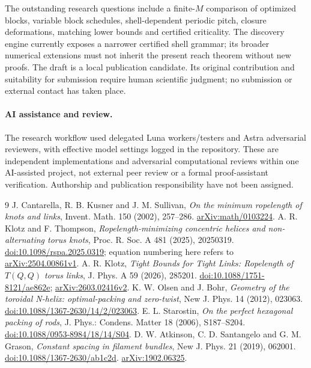 \documentclass[11pt]{article}
\begin{document}
The outstanding research questions include a finite-$M$ comparison of
optimized blocks, variable block schedules, shell-dependent periodic pitch,
closure deformations, matching lower bounds and certified criticality.
The discovery engine currently exposes a narrower certified shell grammar;
its broader numerical extensions must not inherit the present reach theorem
without new proofs. The draft is a local publication candidate. Its original
contribution and suitability for submission require human scientific judgment;
no submission or external contact has taken place.

\paragraph{AI assistance and review.}
The research workflow used delegated Luna workers/testers and Astra adversarial
reviewers, with effective model settings logged in the repository. These are
independent implementations and adversarial computational reviews within one
AI-assisted project, not external peer review or a formal proof-assistant
verification. Authorship and publication responsibility have not been assigned.

\begin{thebibliography}{9}
 J. Cantarella, R. B. Kusner and J. M. Sullivan,
\emph{On the minimum ropelength of knots and links},
Invent. Math. 150 (2002), 257--286. \href{https://arxiv.org/abs/math/0103224}{arXiv:math/0103224}.
 A. R. Klotz and F. Thompson, \emph{Ropelength-minimizing concentric helices and non-alternating torus knots},
Proc. R. Soc. A 481 (2025), 20250319. \href{https://doi.org/10.1098/rspa.2025.0319}{doi:10.1098/rspa.2025.0319}; equation numbering here refers to
\href{https://arxiv.org/html/2504.00861v1}{arXiv:2504.00861v1}.
 A. R. Klotz, \emph{Tight Bounds for Tight Links: Ropelength of $T(Q,Q)$ torus links},
J. Phys. A 59 (2026), 285201.
\href{https://doi.org/10.1088/1751-8121/ae862e}{doi:10.1088/1751-8121/ae862e};
\href{https://arxiv.org/abs/2603.02416v2}{arXiv:2603.02416v2}.
 K. W. Olsen and J. Bohr, \emph{Geometry of the toroidal N-helix: optimal-packing and zero-twist},
New J. Phys. 14 (2012), 023063.
\href{https://doi.org/10.1088/1367-2630/14/2/023063}{doi:10.1088/1367-2630/14/2/023063}.
 E. L. Starostin, \emph{On the perfect hexagonal packing of rods},
J. Phys.: Condens. Matter 18 (2006), S187--S204.
\href{https://doi.org/10.1088/0953-8984/18/14/S04}{doi:10.1088/0953-8984/18/14/S04}.
 D. W. Atkinson, C. D. Santangelo and G. M. Grason,
\emph{Constant spacing in filament bundles}, New J. Phys. 21 (2019), 062001.
\href{https://doi.org/10.1088/1367-2630/ab1c2d}{doi:10.1088/1367-2630/ab1c2d}.
\href{https://arxiv.org/abs/1902.06325}{arXiv:1902.06325}.
\end{thebibliography}
\end{document}
